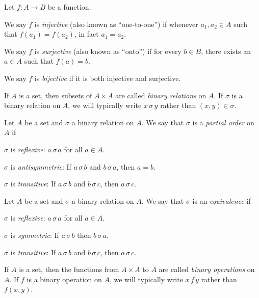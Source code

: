 \begin{proplist}
\item Let \(f : A \rightarrow B\) be a function.
\begin{proplist}
\item We say \(f\) is \emph{injective} (also known as ``one-to-one'') if whenever \(a_1, a_2 \in A\) such that \(f(a_1) = f(a_2)\), in fact \(a_1 = a_2\).
\item We say \(f\) is \emph{surjective} (also known as ``onto'') if for every \(b \in B\), there exists an \(a \in A\) such that \(f(a) = b\).
\item We say \(f\) is \emph{bijective} if it is both injective and surjective.
\end{proplist}

\item If \(A\) is a set, then subsets of \(A \times A\) are called \emph{binary relations} on \(A\).
If \(\sigma\) is a binary relation on \(A\), we will typically write \(x \,\sigma\, y\) rather than \((x,y) \in \sigma\).

\item Let \(A\) be a set and \(\sigma\) a binary relation on \(A\).
We say that \(\sigma\) is a \emph{partial order} on \(A\) if
\begin{proplist}
\item \(\sigma\) is \emph{reflexive}: \(a \,\sigma\, a\) for all \(a \in A\).
\item \(\sigma\) is \emph{antisymmetric}: If \(a \,\sigma\, b\) and \(b \,\sigma\, a\), then \(a = b\).
\item \(\sigma\) is \emph{transitive}: If \(a \,\sigma\, b\) and \(b \,\sigma\, c\), then \(a \,\sigma\, c\).
\end{proplist}

\item Let \(A\) be a set and \(\sigma\) a binary relation on \(A\).
We say that \(\sigma\) is an \emph{equivalence} if
\begin{proplist}
\item \(\sigma\) is \emph{reflexive}: \(a \,\sigma\, a\) for all \(a \in A\).
\item \(\sigma\) is \emph{symmetric}: If \(a \,\sigma\, b\) then \(b \,\sigma\, a\).
\item \(\sigma\) is \emph{transitive}: If \(a \,\sigma\, b\) and \(b \,\sigma\, c\), then \(a \,\sigma\, c\).
\end{proplist}

\item If \(A\) is a set, then the functions from \(A \times A\) to \(A\) are called \emph{binary operations} on \(A\).
If \(f\) is a binary operation on \(A\), we will typically write \(x \,f\, y\) rather than \(f(x,y)\).
\end{proplist}
